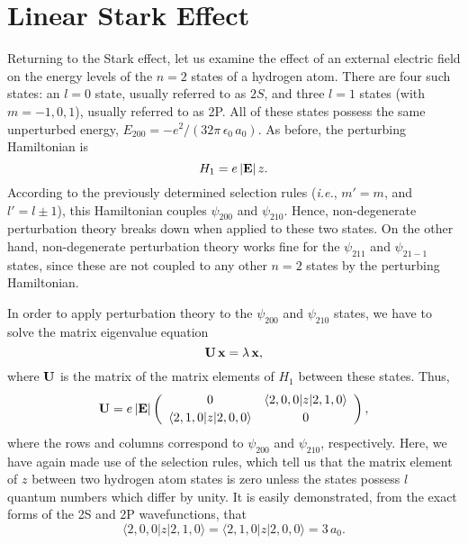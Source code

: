\section{Linear Stark Effect}
Returning to the Stark effect, let us examine the effect of an external electric
field on the energy levels of the $n=2$ states of a hydrogen atom. 
There are four such states: an $l=0$ state, usually referred to as $2S$,
and three $l=1$ states (with $m=-1,0,1$), usually referred to as 2P. All
of these states possess the same unperturbed energy, $E_{200}
= -e^2/(32\pi\,\epsilon_0\,a_0)$. 
As before, the perturbing Hamiltonian is
\begin{equation}
H_1 = e\,|{\bf E}|\,z.
\end{equation}
According to the previously determined selection rules ({\em i.e.}, $m'=m$,
and $l'=l\pm1$), this Hamiltonian couples $\psi_{200}$ and $\psi_{210}$.
Hence, non-degenerate perturbation theory breaks down when applied to
these two states. On the other hand, non-degenerate perturbation
theory works fine for the $\psi_{211}$ and $\psi_{21-1}$ states,
since these are not coupled to any other $n=2$ states by the perturbing
Hamiltonian.

In order to apply perturbation theory to the $\psi_{200}$ and $\psi_{210}$ states, we have to solve the
matrix eigenvalue equation
\begin{equation}
{\bf U}\,{\bf x} = \lambda\,{\bf x},
\end{equation}
where ${\bf U}$ is the matrix of the matrix elements of $H_1$ between these states. Thus,
\begin{equation}
{\bf U} = e\,|{\bf E}|\left(\begin{array}{cc}
0& \langle 2,0,0|z|2,1,0\rangle\\[0.5ex]
\langle 2,1,0|z|2,0,0\rangle&0
\end{array}\right),
\end{equation}
where the rows and columns correspond to  $\psi_{200}$ and $\psi_{210}$, respectively. Here, we have again
made use of the selection rules, which tell us
that the matrix element of $z$ between two hydrogen atom
states is zero unless the states possess $l$ quantum numbers which differ by unity. It is easily demonstrated,
from the exact forms of the 2S  and 2P wavefunctions, that
\begin{equation}
\langle 2,0,0|z|2,1,0\rangle = \langle 2,1,0|z|2,0,0\rangle = 3\,a_0.
\end{equation}

